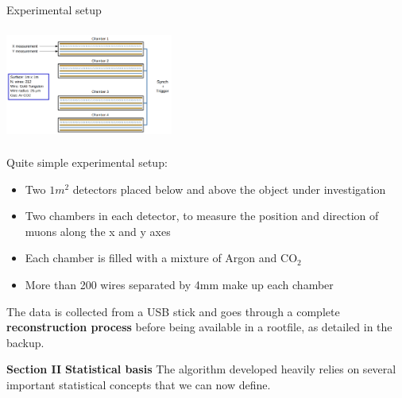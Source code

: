 \documentclass[8 pt]{beamer}
\begin{document}
\begin{frame}{Experimental setup}
\begin{minipage}[c]{.50\textwidth}
\includegraphics[width=5.5cm, height=3.7cm]{figs/muonChambers.png}
\end{minipage} \hfill
\begin{minipage}[c]{.49\textwidth}
\justifying
Quite simple experimental setup:
\begin{itemize}
\justifying
\item Two $1m^2$ detectors placed below and above the object under investigation
\item Two chambers in each detector, to measure the position and direction of muons along the x and y axes
\item Each chamber is filled with a mixture of Argon and CO$_2$
\item More than 200 wires separated by 4mm make up each chamber
\end{itemize}
\end{minipage} \hfill  \vfill

The data is collected from a USB stick and goes through a complete \textbf{\alert{reconstruction process}} before being available in a rootfile, as detailed in the backup. \vfill
\end{frame}








\begin{frame}{}
\centering
	\huge{\textbf{\color{mycolor} Section II}} \newline
	\LARGE{\textbf{\color{mycolor} Statistical basis \color{black}}} \vfill
\Large{The algorithm developed heavily relies on several important statistical concepts that we can now define.} \vfill
\end{frame}
\end{document}
